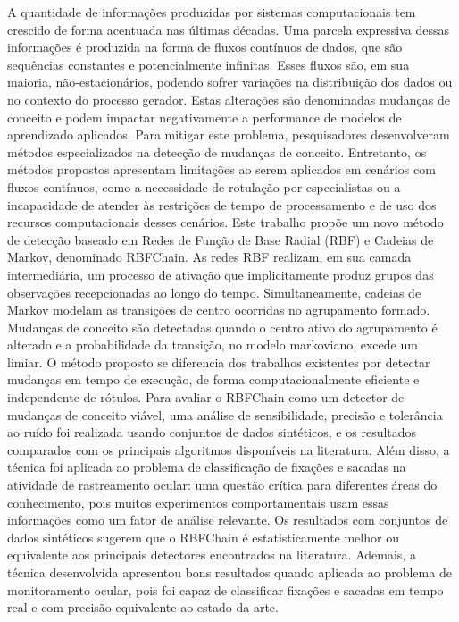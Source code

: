 \documentclass[msc, classic, a4paper]{ufbathesis}
\begin{document}
A quantidade de informações produzidas por sistemas computacionais tem crescido de forma acentuada nas últimas décadas.
Uma parcela expressiva dessas informações é produzida na forma de fluxos contínuos de dados, que são sequências constantes e potencialmente infinitas.
Esses fluxos são, em sua maioria, não-estacionários, podendo sofrer variações na distribuição dos dados ou no contexto do processo gerador.
Estas alterações são denominadas mudanças de conceito e podem impactar negativamente a performance de modelos de aprendizado aplicados.
Para mitigar este problema, pesquisadores desenvolveram métodos especializados na detecção de mudanças de conceito.
Entretanto, os métodos propostos apresentam limitações ao serem aplicados em cenários com fluxos contínuos,
como a necessidade de rotulação por especialistas ou a incapacidade de atender às restrições de tempo de processamento e de uso dos recursos computacionais desses cenários.
Este trabalho propõe um novo método de detecção baseado em Redes de Função de Base Radial (RBF) e Cadeias de Markov, denominado RBFChain.
As redes RBF realizam, em sua camada intermediária, um processo de ativação que implicitamente produz grupos das observações recepcionadas ao longo do tempo.
Simultaneamente, cadeias de Markov modelam as transições de centro ocorridas no agrupamento formado.
Mudanças de conceito são detectadas quando o centro ativo do agrupamento é alterado e a probabilidade da transição, no modelo markoviano, excede um limiar.
O método proposto se diferencia dos trabalhos existentes por detectar mudanças em tempo de execução, de forma computacionalmente eficiente e independente de rótulos.
%
Para avaliar o RBFChain como um detector de mudanças de conceito viável,
uma análise de sensibilidade, precisão e tolerância ao ruído foi realizada usando conjuntos de dados sintéticos,
e os resultados comparados com os principais algoritmos disponíveis na literatura.
%
Além disso, a técnica foi aplicada ao problema de classificação de fixações e sacadas na atividade de rastreamento ocular:
uma questão crítica para diferentes áreas do conhecimento,
pois muitos experimentos comportamentais usam essas informações como um fator de análise relevante.
%
Os resultados com conjuntos de dados sintéticos sugerem que o RBFChain é estatisticamente melhor ou equivalente aos principais detectores encontrados na literatura.
Ademais, a técnica desenvolvida apresentou bons resultados quando aplicada ao problema de monitoramento ocular, pois foi capaz de classificar fixações e sacadas em tempo real e com precisão equivalente ao estado da arte.
\end{document}
